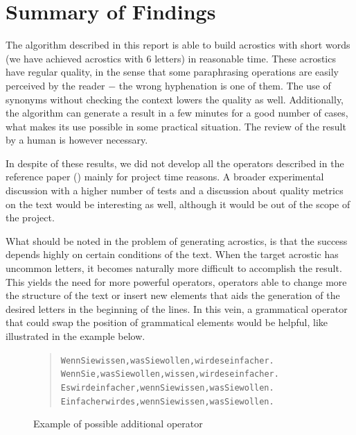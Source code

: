 \documentclass[11pt]{reportAlternative}
\begin{document}
\chapter{Summary of Findings}
The algorithm described in this report is able to build acrostics with short words (we have achieved acrostics with 6 letters) in reasonable time. These acrostics have regular quality, in the sense that some paraphrasing operations are easily perceived by the reader $-$ the wrong hyphenation is one of them. The use of synonyms without checking the context lowers the quality as well. Additionally, the algorithm can generate a result in a few minutes for a good number of cases, what makes its use possible in some practical situation. The review of the result by a human is however necessary. \par

In despite of these results, we did not develop all the operators described in the reference paper (\cite{Stein}) mainly for project time reasons. A broader experimental discussion with a higher number of tests and a discussion about quality metrics on the text would be interesting as well, although it would be out of the scope of the project. \par

What should be noted in the problem of generating acrostics, is that the success depends highly on certain conditions of the text. When the target acrostic has uncommon letters, it becomes naturally more difficult to accomplish the result. This yields the need for more powerful operators, operators able to change more the structure of the text or insert new elements that aids the generation of the desired letters in the beginning of the lines. In this vein, a grammatical operator that could swap the position of grammatical elements would be helpful, like illustrated in the example below. \par

\begin{figure}[H]
\begin{quote}
\begin{alltt}
Wenn Sie wissen, was Sie wollen, wird es einfacher.
Wenn Sie, was Sie wollen, wissen, wird es einfacher.
Es wird einfacher, wenn Sie wissen, was Sie wollen.
Einfacher wird es, wenn Sie wissen, was Sie wollen.
\end{alltt}
\end{quote}
\caption{Example of possible additional operator}
\end{figure}
\end{document}
